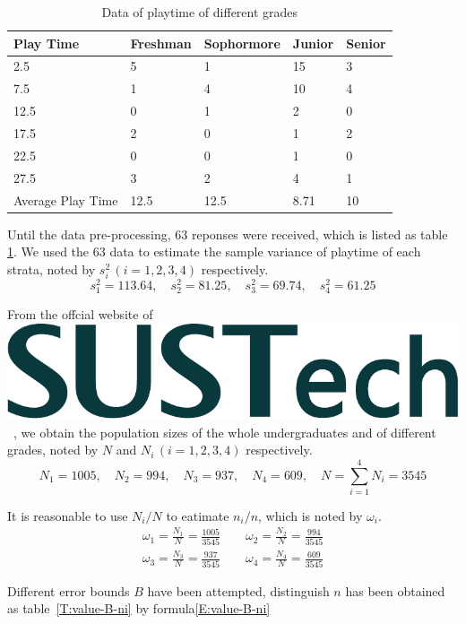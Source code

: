 \documentclass[scheme=plain]{ctexart}
\newcommand{\SUSTech}{\includegraphics[height=2ex]{logo}}
\begin{document}
\begin{table}[htbp]
    \centering
    \begin{tabular}{|l|l|l|l|l|}
        \hline
        Play Time         & Freshman & Sophormore & Junior & Senior \\ \hline
        2.5               & 5        & 1          & 15     & 3      \\ \hline
        7.5               & 1        & 4          & 10     & 4      \\ \hline
        12.5              & 0        & 1          & 2      & 0      \\ \hline
        17.5              & 2        & 0          & 1      & 2      \\ \hline
        22.5              & 0        & 0          & 1      & 0      \\ \hline
        27.5              & 3        & 2          & 4      & 1      \\ \hline
        Average Play Time & 12.5     & 12.5       & 8.71   & 10     \\ \hline
    \end{tabular}
    \caption{Data of playtime of different grades}\label{T:time-diff-grade}
\end{table}

Until the data pre-processing, 63 reponses were received, which is listed as table \ref{T:time-diff-grade}. We used the 63 data to estimate the sample variance of playtime of each strata, noted by $s_i^2\,(i=1,2,3,4)$ respectively.
\[
s_1^2=113.64,\quad s_2^2=81.25,\quad s_3^2=69.74,\quad s_4^2=61.25
\]

From the offcial website of \SUSTech\ , we obtain the population sizes of the whole undergraduates and of different grades, noted by $N$ and $N_i\,(i=1,2,3,4)$ respectively.
\[
N_1=1005,\quad N_2=994,\quad N_3=937,\quad N_4=609,\quad N=\sum_{i=1}^4N_i=3545
\]

It is reasonable to use $N_i/N$ to eatimate $n_i/n$, which is noted by $\omega_i$.
\begin{align*}
    \omega_1 = \frac{N_1}{N} = \frac{1005}{3545} \qquad \omega_2 = \frac{N_2}{N} = \frac{994}{3545} \\
    \omega_3 = \frac{N_3}{N} = \frac{937}{3545} \qquad \omega_4 = \frac{N_4}{N} = \frac{609}{3545}
\end{align*}

Different error bounds $B$ have been attempted, distinguish $n$ has been obtained as table~\ref{T:value-B-ni} by formula\eqref{E:value-B-ni}
\end{document}
